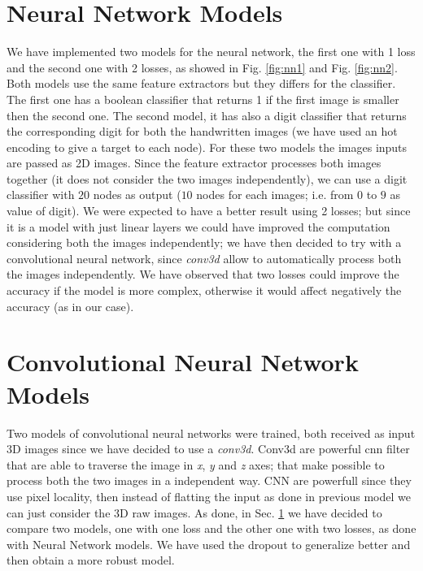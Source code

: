 \documentclass[journal, a4paper]{IEEEtran}
\begin{document}
\section{Neural Network Models}
\label{sec:nnmodel}
We have implemented two models for the neural network, the first one with 1 loss and the second one with 2 losses, as showed in Fig. \ref{fig:nn1} and Fig. \ref{fig:nn2}. Both models use the same feature extractors but they differs for the classifier. The first one has a boolean classifier that returns 1 if the first image is smaller then the second one. The second model, it has also a digit classifier that returns the corresponding digit for both the handwritten images (we have used an hot encoding to give a target to each node).
For these two models the images inputs are passed as 2D images.  Since the feature extractor processes both images together (it does not consider the two images independently), we can use a digit classifier with $20$ nodes as output ($10$ nodes for each images; i.e. from $0$ to $9$ as value of digit). We were expected to have a better result using 2 losses; but since it is a model with just linear layers we could have improved the computation considering both the images independently; we have then decided to try with a convolutional neural network, since \textit{conv3d} allow to automatically process both the images independently. We have observed that two losses could improve the accuracy if the model is more complex, otherwise it would affect negatively the accuracy (as in our case).


\section{Convolutional Neural Network Models}
\label{sec:cnnmodel}
Two models of convolutional neural networks were trained, both received as input 3D images since we have decided to use a \textit{conv3d}. Conv3d are powerful cnn filter that are able to traverse the image in \textit{x}, \textit{y} and \textit{z} axes; that make possible to process both the two images in a independent way. CNN are powerfull since they use pixel locality, then instead of flatting the input as done in previous model we can just consider the 3D raw images. As done, in Sec. \ref{sec:nnmodel} we have decided to compare two models, one with one loss and the other one with two losses, as done with Neural Network models. 
We have used the dropout to generalize better and then obtain a more robust model.
\end{document}
